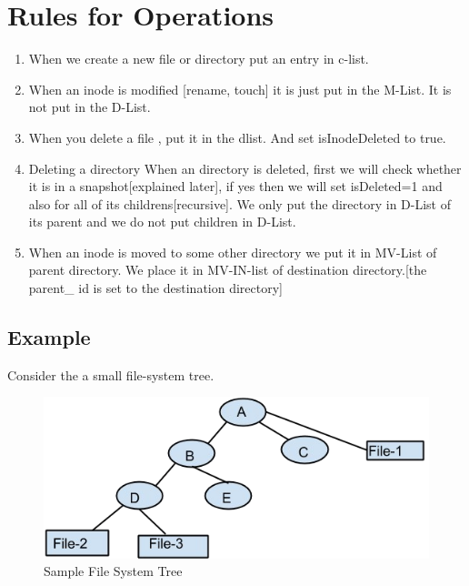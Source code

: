 \section{Rules for Operations}
\begin{enumerate}

\item  When we create a new file or directory put an entry in c-list.

\item When an inode is modified [rename, touch] it is just put in the M-List. It is not put in the D-List.

\item When you delete a file , put it in the dlist. And set isInodeDeleted to true.

\item Deleting a directory
When an directory is deleted, first we will check  whether it is in a snapshot[explained later], if yes then we will set isDeleted=1 and also for all of its childrens[recursive]. We only put the directory in D-List of its parent and we do not put children in D-List.

\item When an inode is moved to some other directory we put it in  MV-List of parent directory. We place it in MV-IN-list of destination  directory.[the parent\_ id is set to the destination directory]

\end{enumerate}

\subsection{Example}
Consider the a small file-system tree.\\
\begin{figure}[!h]
\centering  
 \includegraphics[scale=0.5]{figs/preliminar/FileSystemExample.png}
  \caption{Sample File System Tree}
  \label{fig:ExampleFileSystem}
\end{figure}


